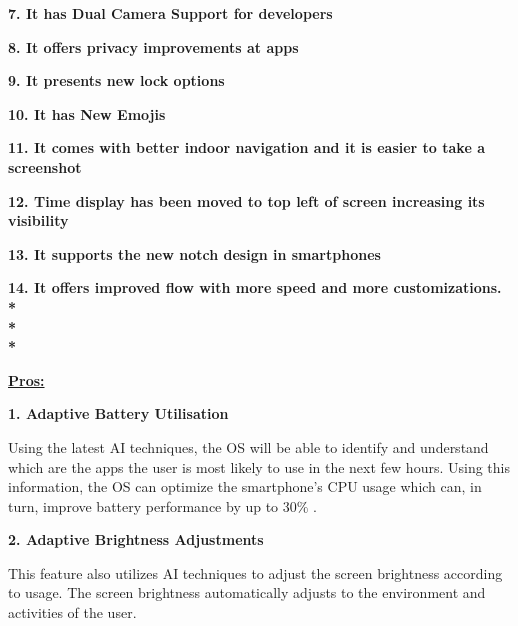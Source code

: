 \documentclass[12pt]{article}
\begin{document}
\textbf{\textcolor[HTML]{4A4A4A}{7. It has Dual Camera Support for developers}}\par

\textbf{\textcolor[HTML]{4A4A4A}{8. It offers privacy improvements at apps}}\par

\textbf{\textcolor[HTML]{4A4A4A}{9. It presents new lock options}}\par

\textbf{\textcolor[HTML]{4A4A4A}{10. It has New Emojis}}\par

\textbf{\textcolor[HTML]{4A4A4A}{11. It comes with better indoor navigation and it is easier to take a screenshot}}\par

\textbf{\textcolor[HTML]{4A4A4A}{12. Time display has been moved to top left of screen increasing its visibility}}\par

\textbf{\textcolor[HTML]{4A4A4A}{13. It supports the new notch design in smartphones}}\par

\textbf{\textcolor[HTML]{4A4A4A}{14. It offers improved flow with more speed and more customizations.\\*\\*\\*
}}\par

\setlength{\parskip}{8.04pt}

{\fontsize{18pt}{21.6pt}\selectfont \textbf{\uline{Pros:}}\par}\par

\setlength{\parskip}{8.04pt}

\textbf{\textcolor[HTML]{4A4A4A}{1. Adaptive Battery Utilisation}}\par

\textcolor[HTML]{4A4A4A}{Using the latest AI techniques, the OS will be able to identify and understand which are the apps the user is most likely to use in the next few hours. Using this information, the OS can optimize the smartphone’s CPU usage which can, in turn, improve battery performance by up to 30$\%$ .}\par

\textbf{\textcolor[HTML]{4A4A4A}{2. Adaptive Brightness Adjustments}}\par

\textcolor[HTML]{4A4A4A}{This feature also utilizes AI techniques to adjust the screen brightness according to usage. The screen brightness automatically adjusts to the environment and activities of the user.}\par
\end{document}
